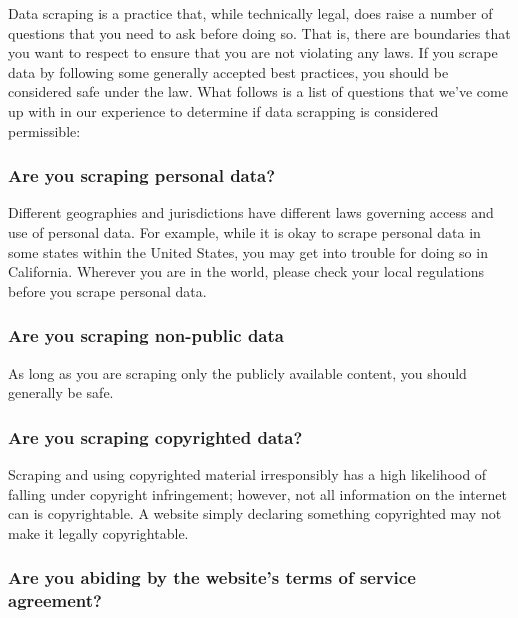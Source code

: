 \documentclass[
  12pt,
]{krantz}
\begin{document}
Data scraping is a practice that, while technically legal, does raise a number of questions that you need to ask before doing so. That is, there are boundaries that you want to respect to ensure that you are not violating any laws. If you scrape data by following some generally accepted best practices, you should be considered safe under the law. What follows is a list of questions that we've come up with in our experience to determine if data scrapping is considered permissible:

\hypertarget{are-you-scraping-personal-data}{%
\subsubsection*{Are you scraping personal data?}\label{are-you-scraping-personal-data}}


Different geographies and jurisdictions have different laws governing access and use of personal data. For example, while it is okay to scrape personal data in some states within the United States, you may get into trouble for doing so in California. Wherever you are in the world, please check your local regulations before you scrape personal data.

\hypertarget{are-you-scraping-non-public-data}{%
\subsubsection*{Are you scraping non-public data}\label{are-you-scraping-non-public-data}}


As long as you are scraping only the publicly available content, you should generally be safe.

\hypertarget{are-you-scraping-copyrighted-data}{%
\subsubsection*{Are you scraping copyrighted data?}\label{are-you-scraping-copyrighted-data}}


Scraping and using copyrighted material irresponsibly has a high likelihood of falling under copyright infringement; however, not all information on the internet can is copyrightable. A website simply declaring something copyrighted may not make it legally copyrightable.

\hypertarget{are-you-abiding-by-the-websites-terms-of-service-agreement}{%
\subsubsection*{Are you abiding by the website's terms of service agreement?}\label{are-you-abiding-by-the-websites-terms-of-service-agreement}}
\end{document}
